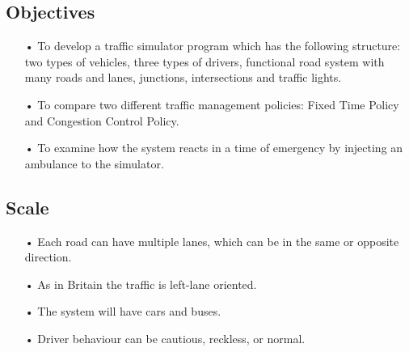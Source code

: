 \documentclass[11pt]{article}
\begin{document}
\subsection{Objectives}
\begin{itemize}
\item[•] To develop a traffic simulator program which has the following structure: two types of vehicles, three types of drivers, functional road system with many roads and lanes, junctions, intersections and traffic lights.
\item[•] To compare two different traffic management policies: Fixed Time Policy and Congestion Control Policy.
\item[•] To examine how the system reacts in a time of emergency by injecting an ambulance to the simulator.
\end{itemize}

\subsection{Scale}
\begin{itemize}
\item[•] Each road can have multiple lanes, which can be in the same or opposite direction.
\item[•] As in Britain the traffic is left-lane oriented.
\item[•] The system will have cars and buses.
\item[•] Driver behaviour can be cautious, reckless, or normal.
\end{itemize}
\end{document}
